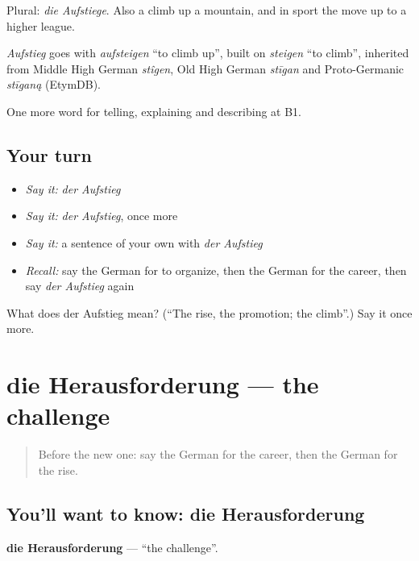 Plural: \emph{die Aufstiege}. Also a climb up a mountain, and in sport the move up to a higher league.

\begin{cousinweb}
\emph{Aufstieg} goes with \emph{aufsteigen} \textquotedblleft{}to climb up\textquotedblright{}, built on \emph{steigen} \textquotedblleft{}to climb\textquotedblright{}, inherited from Middle High German \emph{stîgen}, Old High German \emph{stīgan} and Proto-Germanic \emph{stīganą} (EtymDB).
\end{cousinweb}

\begin{grammarlens}[title={What you've built}]
One more word for telling, explaining and describing at B1.
\end{grammarlens}

\subsection*{Your turn}
\begin{itemize}
\raggedright
  \item \emph{Say it:} \emph{der Aufstieg}
  \item \emph{Say it:} \emph{der Aufstieg}, once more
  \item \emph{Say it:} a sentence of your own with \emph{der Aufstieg}
  \item \emph{Recall:} say the German for to organize, then the German for the career, then say \emph{der Aufstieg} again
\end{itemize}

\begin{tcolorbox}[breakable,colback=teal!4,colframe=teal!35!black,title={Before you move on}]
What does der Aufstieg mean? (\textquotedblleft{}The rise, the promotion; the climb\textquotedblright{}.) Say it once more.
\end{tcolorbox}
\section[die Herausforderung]{die Herausforderung — the challenge}

\label{lesson:GE-C356-herausforderung}



\begin{quote}
Before the new one: say the German for the career, then the German for the rise.
\end{quote}

\subsection*{You'll want to know: die Herausforderung}
\textbf{die Herausforderung} — \textquotedblleft{}the challenge\textquotedblright{}.

